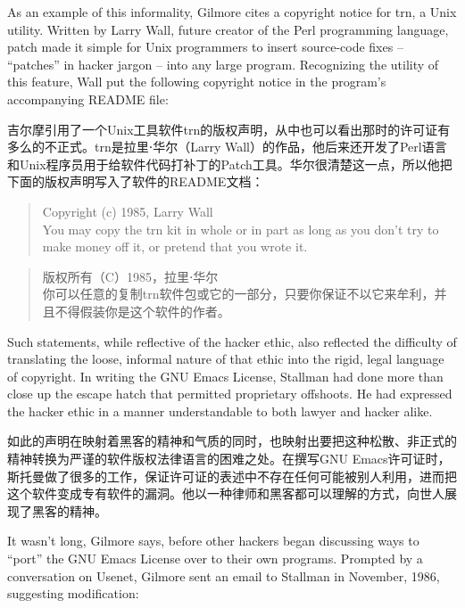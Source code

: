 \ifdefined\eng
As an example of this informality, Gilmore cites a copyright notice for trn, a Unix utility. Written by Larry Wall, future creator of the Perl programming language, patch made it simple for Unix programmers to insert source-code fixes -- ``patches'' in hacker jargon -- into any large program. Recognizing the utility of this feature, Wall put the following copyright notice in the program's accompanying README file:
\fi

\ifdefined\chs
吉尔摩引用了一个Unix工具软件trn的版权声明，从中也可以看出那时的许可证有多么的不正式。trn是拉里⋅华尔（Larry Wall）的作品，他后来还开发了Perl语言和Unix程序员用于给软件代码打补丁的Patch工具。华尔很清楚这一点，所以他把下面的版权声明写入了软件的README文档：
\fi

\ifdefined\eng
\begin{quote}
Copyright (c) 1985, Larry Wall\\
You may copy the trn kit in whole or in part as long as you don't try to make money off it, or pretend that you wrote it.
\end{quote}
\fi

\ifdefined\chs
\begin{quote}
版权所有（C）1985，拉里⋅华尔\\
你可以任意的复制trn软件包或它的一部分，只要你保证不以它来牟利，并且不得假装你是这个软件的作者。
\end{quote}
\fi

\ifdefined\eng
Such statements, while reflective of the hacker ethic, also reflected the difficulty of translating the loose, informal nature of that ethic into the rigid, legal language of copyright. In writing the GNU Emacs License, Stallman had done more than close up the escape hatch that permitted proprietary offshoots. He had expressed the hacker ethic in a manner understandable to both lawyer and hacker alike.
\fi

\ifdefined\chs
如此的声明在映射着黑客的精神和气质的同时，也映射出要把这种松散、非正式的精神转换为严谨的软件版权法律语言的困难之处。在撰写GNU Emacs许可证时，斯托曼做了很多的工作，保证许可证的表述中不存在任何可能被别人利用，进而把这个软件变成专有软件的漏洞。他以一种律师和黑客都可以理解的方式，向世人展现了黑客的精神。
\fi

\ifdefined\eng
It wasn't long, Gilmore says, before other hackers began discussing ways to ``port'' the GNU Emacs License over to their own programs. Prompted by a conversation on Usenet, Gilmore sent an email to Stallman in November, 1986, suggesting modification:
\fi

